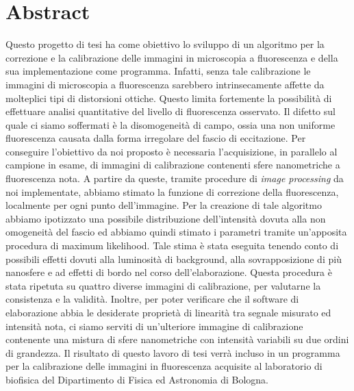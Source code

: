 \clearpage{\pagestyle{empty}\cleardoublepage}

\chapter*{Abstract}


Questo progetto di tesi ha come obiettivo lo sviluppo di un algoritmo per la correzione e la calibrazione delle immagini in microscopia a fluorescenza e della sua implementazione come programma.
Infatti, senza tale calibrazione le immagini di microscopia a fluorescenza sarebbero intrinsecamente affette da molteplici tipi di distorsioni ottiche.
Questo limita fortemente la possibilità di effettuare analisi quantitative del livello di fluorescenza osservato.
Il difetto sul quale ci siamo soffermati è la disomogeneità di campo, ossia una non uniforme fluorescenza causata dalla forma irregolare del fascio di eccitazione.
Per conseguire l'obiettivo da noi proposto è necessaria l'acquisizione, in parallelo al campione in esame, di immagini di calibrazione contenenti sfere nanometriche a fluorescenza nota.
A partire da queste, tramite procedure di \textit{image processing} da noi implementate, abbiamo stimato la funzione di correzione della fluorescenza, localmente per ogni punto dell'immagine.
Per la creazione di tale algoritmo abbiamo ipotizzato una possibile distribuzione dell'intensità dovuta alla non omogeneità del fascio ed abbiamo quindi stimato i parametri tramite un'apposita procedura di maximum likelihood.
Tale stima è stata eseguita tenendo conto di possibili effetti dovuti alla luminosità di background, alla sovrapposizione di più nanosfere e ad effetti di bordo nel corso dell'elaborazione.
Questa procedura è stata ripetuta su quattro diverse immagini di calibrazione, per valutarne la consistenza e la validità.
Inoltre, per poter verificare che il software di elaborazione abbia le desiderate proprietà di linearità tra segnale misurato ed intensità nota, ci siamo serviti di un'ulteriore immagine di calibrazione contenente una mistura di sfere nanometriche con intensità variabili su due ordini di grandezza.
Il risultato di questo lavoro di tesi verrà incluso in un programma per la calibrazione delle immagini in fluorescenza acquisite al laboratorio di biofisica del Dipartimento di Fisica ed Astronomia di Bologna.
